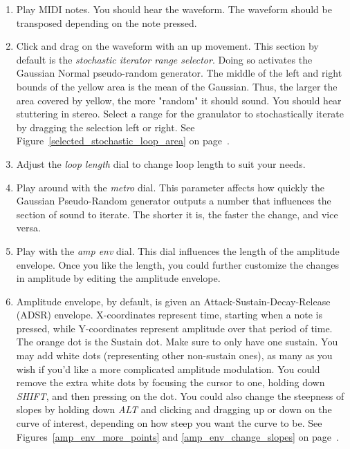 \documentclass{article}
\begin{document}
\begin{enumerate}
				\item Play MIDI notes. You should hear the waveform. The waveform should be transposed depending on the note pressed.  

				\item Click and drag on the waveform with an up movement. This section by default is the \emph{stochastic iterator range selector}. Doing so activates the Gaussian Normal pseudo-random generator. The middle of the left and right bounds of the yellow area is the mean of the Gaussian. Thus, the larger the area covered by yellow, the more "random" it should sound.  You should hear stuttering in stereo.  Select a range for the granulator to stochastically iterate by dragging the selection left or right. See Figure~\ref{selected_stochastic_loop_area} on page~\pageref{selected_stochastic_loop_area}.

				\item Adjust the \emph{loop length} dial to change loop length to suit your needs.

				\item Play around with the \emph{metro} dial.  This parameter affects how quickly the Gaussian Pseudo-Random generator outputs a number that influences the section of sound to iterate.  The shorter it is, the faster the change, and vice versa.

				\item Play with the \emph{amp env} dial. This dial influences the length of the amplitude envelope.  Once you like the length, you could further customize the changes in amplitude by editing the amplitude envelope.  

				\item Amplitude envelope, by default, is given an Attack-Sustain-Decay-Release (ADSR) envelope. X-coordinates represent time, starting when a note is pressed, while Y-coordinates represent amplitude over that period of time.  The orange dot is the Sustain dot.  Make sure to only have one sustain.  You may add white dots (representing other non-sustain ones), as many as you wish if you'd like a more complicated amplitude modulation. You could remove the extra white dots by focusing the cursor to one, holding down \emph{SHIFT}, and then pressing on the dot.  You could also change the steepness of slopes by holding down \emph{ALT} and clicking and dragging up or down on the curve of interest, depending on how steep you want the curve to be.  See Figures~\ref{amp_env_more_points} and \ref{amp_env_change_slopes} on page~\pageref{editing amplitude envelope}.


\end{enumerate}
\end{document}

